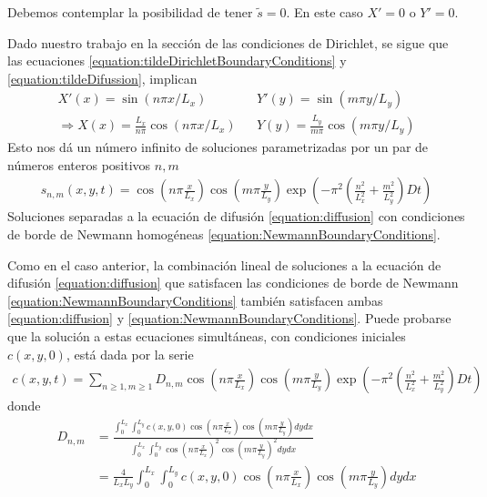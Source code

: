 \documentclass{article}
\begin{document}
  Debemos contemplar la posibilidad de tener \(\tilde{s} = 0\).
  En este caso \(X' = 0\) o \(Y' = 0\).

  Dado nuestro trabajo en la sección de las condiciones de Dirichlet, se sigue que las ecuaciones \eqref{equation:tildeDirichletBoundaryConditions} y \eqref{equation:tildeDifussion}, implican
  \begin{align}
    X'(x) = \sin(n \pi x / L_x)
    &&Y'(y) = \sin(m \pi y / L_y)
    \\
    \Rightarrow
    X(x) = \frac{L_x}{n \pi} \cos(n \pi x / L_x)
    && Y(y) = \frac{L_y}{m \pi} \cos(m \pi y / L_y)
  \end{align}
  Esto nos dá un número infinito de soluciones parametrizadas por un par de números enteros positivos \(n, m\)
  \begin{align}
    s_{n, m}(x, y, t)
    =
    \cos\left( n \pi \frac{x}{L_x} \right) \cos\left(m \pi \frac{y}{L_y} \right) \exp\left( - \pi^2 \left( \frac{n^2}{L_x^2} + \frac{m^2}{L_y^2} \right) D t \right)
  \end{align}
  Soluciones separadas a la ecuación de difusión \eqref{equation:diffusion} con condiciones de borde de Newmann homogéneas \eqref{equation:NewmannBoundaryConditions}.


  Como en el caso anterior, la combinación lineal de soluciones a la ecuación de difusión \eqref{equation:diffusion} que satisfacen las condiciones de borde de Newmann \eqref{equation:NewmannBoundaryConditions} también satisfacen ambas \eqref{equation:diffusion} y \eqref{equation:NewmannBoundaryConditions}.
  Puede probarse que la solución a estas ecuaciones simultáneas, con condiciones iniciales \(c(x, y, 0)\), está dada por la serie
  \begin{align}
    c(x, y, t)
    =
    \sum_{n \geq 1, m \geq 1}
      D_{n, m}
      \cos\left( n \pi \frac{x}{L_x} \right)
      \cos\left( m \pi \frac{y}{L_y} \right)
      \exp\left(
        - \pi^2 \left(
          \frac{n^2}{L_x^2} + \frac{m^2}{L_y^2}
        \right)
        D t
      \right)
  \end{align}
  donde
  \begin{align}
    D_{n, m}
    &=
    \frac{
      \int_0^{L_x}
        \int_0^{L_y}
          c(x, y, 0)
          \cos\left( n \pi \frac{x}{L_x} \right)
          \cos\left( m \pi \frac{y}{L_y} \right)
        d y
      d x
    }{
      \int_0^{L_x}
        \int_0^{L_y}
        \cos\left( n \pi \frac{x}{L_x} \right)^2
        \cos\left( m \pi \frac{y}{L_y} \right)^2
        d y
      d x
    }
    \\
    &=
    \frac{4}{L_x L_y} 
    \int_0^{L_x}
      \int_0^{L_y}
        c(x, y, 0)
        \cos\left( n \pi \frac{x}{L_x} \right)
        \cos\left( m \pi \frac{y}{L_y} \right)
      d y
    d x
  \end{align}
\end{document}
